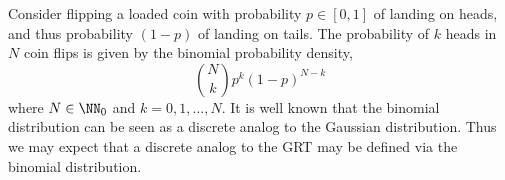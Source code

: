 





Consider flipping a loaded coin with probability $p \in [0,1]$ of landing on heads, and thus probability $(1 - p)$ of landing on tails. The probability of $k$ heads in $N$ coin flips is given by the binomial probability density,
\[
  \binom{N}{k}p^k(1-p)^{N-k}
\]
where $N \in \NN_0$ and $k = 0, 1, \ldots, N$. It is well known that the binomial distribution can be seen as a discrete analog to the Gaussian distribution. Thus we may expect that a discrete analog to the GRT may be defined via the binomial distribution.

